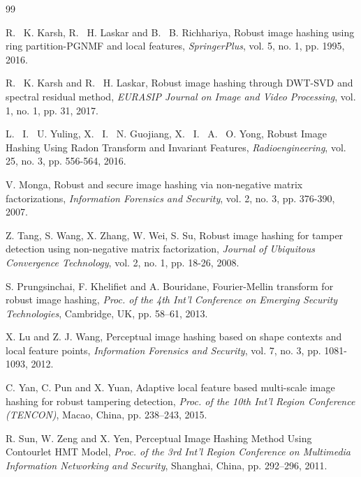 \documentclass[12pt,a4paper]{jihmsp}
\begin{document}
{{\begin {thebibliography}{99}
		
		
		R. ~K. Karsh, R. ~H. Laskar and B. ~B. Richhariya, Robust image hashing using ring partition-PGNMF and local features, {\em SpringerPlus}, vol. 5, no. 1, pp. 1995, 2016.
		 
		 
		R. ~K. Karsh and R. ~H. Laskar,
		Robust image hashing through DWT-SVD and spectral residual method, {\em EURASIP Journal on Image and Video Processing}, vol. 1, no. 1, pp. 31, 2017.
		
		
		L. ~I. ~U. Yuling, X. ~I. ~N. Guojiang, X. ~I. ~A. ~O. Yong, Robust Image Hashing Using Radon Transform and Invariant Features, {\em Radioengineering}, vol. 25, no. 3, pp. 556-564, 2016.
		
		
		
		V. Monga, Robust and secure image hashing via non-negative matrix factorizations, 	{\em Information Forensics and Security}, vol. 2, no. 3, pp. 376-390, 2007.
		
		
				
		Z. Tang, S. Wang, X. Zhang, W. Wei, S. Su, Robust image hashing for tamper detection using non-negative matrix factorization, {\em Journal of Ubiquitous Convergence Technology}, vol. 2, no. 1, pp. 18-26, 2008.
		
		
			
		S. Prungsinchai, F. Khelifiet and A. Bouridane, Fourier-Mellin transform for robust image hashing, {\em Proc. of the 4th Int'l Conference on Emerging Security Technologies}, Cambridge, UK, pp. 58--61, 2013.
		
		
	
		X. Lu and Z. J. Wang, Perceptual image hashing based on shape contexts and local feature points, {\em Information Forensics and Security}, vol. 7, no. 3, pp. 1081-1093, 2012.
		

		C. Yan, C. Pun and X. Yuan, Adaptive local feature based multi-scale image hashing for robust tampering detection, {\em Proc. of the 10th Int'l Region Conference (TENCON)}, Macao, China, pp. 238--243, 2015.


		R. Sun, W. Zeng and X. Yen,
		Perceptual Image Hashing Method Using Contourlet HMT Model, {\em Proc. of the 3rd Int'l Region Conference on Multimedia Information Networking and Security}, Shanghai, China, pp. 292--296, 2011.
		

\end{thebibliography}}}
\end{document}
